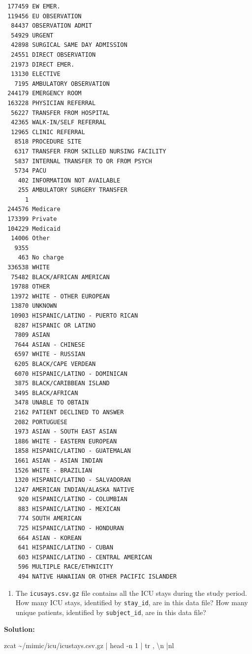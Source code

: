 \documentclass[
]{article}
\newenvironment{Shaded}{\begin{snugshade}}{\end{snugshade}}
\newcommand{\AttributeTok}[1]{\textcolor[rgb]{0.40,0.45,0.13}{#1}}
\newcommand{\FunctionTok}[1]{\textcolor[rgb]{0.28,0.35,0.67}{#1}}
\newcommand{\KeywordTok}[1]{\textcolor[rgb]{0.00,0.23,0.31}{#1}}
\newcommand{\NormalTok}[1]{\textcolor[rgb]{0.00,0.23,0.31}{#1}}
\newcommand{\StringTok}[1]{\textcolor[rgb]{0.13,0.47,0.30}{#1}}
\providecommand{\tightlist}{%
  \setlength{\itemsep}{0pt}\setlength{\parskip}{0pt}}\usepackage{longtable,booktabs,array}
\begin{document}
\begin{verbatim}
 177459 EW EMER.
 119456 EU OBSERVATION
  84437 OBSERVATION ADMIT
  54929 URGENT
  42898 SURGICAL SAME DAY ADMISSION
  24551 DIRECT OBSERVATION
  21973 DIRECT EMER.
  13130 ELECTIVE
   7195 AMBULATORY OBSERVATION
 244179 EMERGENCY ROOM
 163228 PHYSICIAN REFERRAL
  56227 TRANSFER FROM HOSPITAL
  42365 WALK-IN/SELF REFERRAL
  12965 CLINIC REFERRAL
   8518 PROCEDURE SITE
   6317 TRANSFER FROM SKILLED NURSING FACILITY
   5837 INTERNAL TRANSFER TO OR FROM PSYCH
   5734 PACU
    402 INFORMATION NOT AVAILABLE
    255 AMBULATORY SURGERY TRANSFER
      1 
 244576 Medicare
 173399 Private
 104229 Medicaid
  14006 Other
   9355 
    463 No charge
 336538 WHITE
  75482 BLACK/AFRICAN AMERICAN
  19788 OTHER
  13972 WHITE - OTHER EUROPEAN
  13870 UNKNOWN
  10903 HISPANIC/LATINO - PUERTO RICAN
   8287 HISPANIC OR LATINO
   7809 ASIAN
   7644 ASIAN - CHINESE
   6597 WHITE - RUSSIAN
   6205 BLACK/CAPE VERDEAN
   6070 HISPANIC/LATINO - DOMINICAN
   3875 BLACK/CARIBBEAN ISLAND
   3495 BLACK/AFRICAN
   3478 UNABLE TO OBTAIN
   2162 PATIENT DECLINED TO ANSWER
   2082 PORTUGUESE
   1973 ASIAN - SOUTH EAST ASIAN
   1886 WHITE - EASTERN EUROPEAN
   1858 HISPANIC/LATINO - GUATEMALAN
   1661 ASIAN - ASIAN INDIAN
   1526 WHITE - BRAZILIAN
   1320 HISPANIC/LATINO - SALVADORAN
   1247 AMERICAN INDIAN/ALASKA NATIVE
    920 HISPANIC/LATINO - COLUMBIAN
    883 HISPANIC/LATINO - MEXICAN
    774 SOUTH AMERICAN
    725 HISPANIC/LATINO - HONDURAN
    664 ASIAN - KOREAN
    641 HISPANIC/LATINO - CUBAN
    603 HISPANIC/LATINO - CENTRAL AMERICAN
    596 MULTIPLE RACE/ETHNICITY
    494 NATIVE HAWAIIAN OR OTHER PACIFIC ISLANDER
\end{verbatim}

\begin{enumerate}
\def\labelenumi{\arabic{enumi}.}
\setcounter{enumi}{6}
\tightlist
\item
  The \texttt{icusays.csv.gz} file contains all the ICU stays during the
  study period. How many ICU stays, identified by \texttt{stay\_id}, are
  in this data file? How many unique patients, identified by
  \texttt{subject\_id}, are in this data file?
\end{enumerate}

\textbf{Solution:}

\begin{Shaded}
\begin{Highlighting}[]
\FunctionTok{zcat}\NormalTok{ \textasciitilde{}/mimic/icu/icustays.csv.gz }\KeywordTok{|} \FunctionTok{head} \AttributeTok{{-}n}\NormalTok{ 1 }\KeywordTok{|} \FunctionTok{tr} \StringTok{\textquotesingle{},\textquotesingle{}} \StringTok{\textquotesingle{}\textbackslash{}n\textquotesingle{}} \KeywordTok{|}\FunctionTok{nl}
\end{Highlighting}
\end{Shaded}
\end{document}
